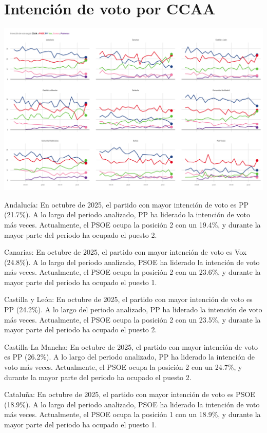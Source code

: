 \documentclass[
  letterpaper,
  DIV=11,
  numbers=noendperiod]{scrreprt}
\begin{document}
\chapter{Intención de voto por
CCAA}\label{intenciuxf3n-de-voto-por-ccaa}

\includegraphics[width=8in,height=\textheight,keepaspectratio]{figures/p_idv_ccaa_static.png}

Andalucía: En octubre de 2025, el partido con mayor intención de voto es
PP (21.7\%). A lo largo del periodo analizado, PP ha liderado la
intención de voto más veces. Actualmente, el PSOE ocupa la posición 2
con un 19.4\%, y durante la mayor parte del periodo ha ocupado el puesto
2.

Canarias: En octubre de 2025, el partido con mayor intención de voto es
Vox (24.8\%). A lo largo del periodo analizado, PSOE ha liderado la
intención de voto más veces. Actualmente, el PSOE ocupa la posición 2
con un 23.6\%, y durante la mayor parte del periodo ha ocupado el puesto
1.

Castilla y León: En octubre de 2025, el partido con mayor intención de
voto es PP (24.2\%). A lo largo del periodo analizado, PP ha liderado la
intención de voto más veces. Actualmente, el PSOE ocupa la posición 2
con un 23.5\%, y durante la mayor parte del periodo ha ocupado el puesto
2.

Castilla-La Mancha: En octubre de 2025, el partido con mayor intención
de voto es PP (26.2\%). A lo largo del periodo analizado, PP ha liderado
la intención de voto más veces. Actualmente, el PSOE ocupa la posición 2
con un 24.7\%, y durante la mayor parte del periodo ha ocupado el puesto
2.

Cataluña: En octubre de 2025, el partido con mayor intención de voto es
PSOE (18.9\%). A lo largo del periodo analizado, PSOE ha liderado la
intención de voto más veces. Actualmente, el PSOE ocupa la posición 1
con un 18.9\%, y durante la mayor parte del periodo ha ocupado el puesto
1.
\end{document}
